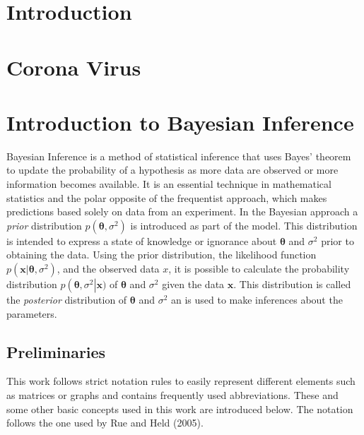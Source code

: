 \documentclass[12pt]{book}
\begin{document}
\tableofcontents
\chapter{Introduction}
\chapter{Corona Virus}
\chapter{Introduction to Bayesian Inference}
Bayesian Inference is a method of statistical inference that uses Bayes' theorem to update the probability of a hypothesis as more data are observed or more information becomes available. It is an essential technique in mathematical statistics and the polar opposite of the frequentist approach, which makes predictions based solely on data from an experiment. In the Bayesian approach a \textit{prior} distribution $p\left(\pmb{\theta}, \sigma^2\right)$ is introduced as part of the model. This distribution is intended to express a state of knowledge or ignorance about $\pmb{\theta}$ and $\sigma^2$ prior to obtaining the data. Using the prior distribution, the likelihood function $p\left(\pmb{x}|\pmb{\theta},\sigma^2\right)$, and the observed data $x$, it is possible to calculate the probability distribution $p\left(\pmb{\theta},\sigma^2\right|\pmb{x})$ of $\pmb{\theta}$ and $\sigma^2$ given the data $\pmb{x}$. This distribution is called the \textit{posterior} distribution of $\pmb{\theta}$ and $\sigma^2$ an is used to make inferences about the parameters\autocite[Cf.][]{box2011bayesian}.
\section{Preliminaries}
This work follows strict notation rules to easily represent different elements such as matrices or graphs and contains frequently used abbreviations. These and some other basic concepts used in this work are introduced below. The notation follows the one used by Rue and Held (2005)\autocite[Cf.][]{rue2005gaussian}.
\end{document}
